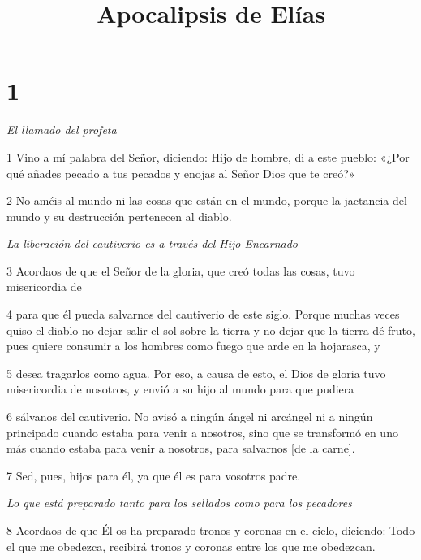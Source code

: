 

\title{Apocalipsis de Elías}

\chapter{1}

\par \textit{El llamado del profeta}

\par 1 Vino a mí palabra del Señor, diciendo: Hijo de hombre, di a este pueblo: «¿Por qué añades pecado a tus pecados y enojas al Señor Dios que te creó?»

\par 2 No améis al mundo ni las cosas que están en el mundo, porque la jactancia del mundo y su destrucción pertenecen al diablo.

\par \textit{La liberación del cautiverio es a través del Hijo Encarnado}

\par 3 Acordaos de que el Señor de la gloria, que creó todas las cosas, tuvo misericordia de

\par 4 para que él pueda salvarnos del cautiverio de este siglo. Porque muchas veces quiso el diablo no dejar salir el sol sobre la tierra y no dejar que la tierra dé fruto, pues quiere consumir a los hombres como fuego que arde en la hojarasca, y

\par 5 desea tragarlos como agua. Por eso, a causa de esto, el Dios de gloria tuvo misericordia de nosotros, y envió a su hijo al mundo para que pudiera

\par 6 sálvanos del cautiverio. No avisó a ningún ángel ni arcángel ni a ningún principado cuando estaba para venir a nosotros, sino que se transformó en uno más cuando estaba para venir a nosotros, para salvarnos [de la carne].

\par 7 Sed, pues, hijos para él, ya que él es para vosotros padre.

\par \textit{Lo que está preparado tanto para los sellados como para los pecadores}

\par 8 Acordaos de que Él os ha preparado tronos y coronas en el cielo, diciendo: Todo el que me obedezca, recibirá tronos y coronas entre los que me obedezcan.

